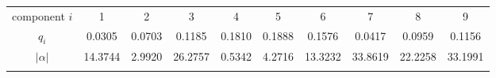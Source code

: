 %
%

\begin{table}
\footnotesize
\begin{center}
\begin{tabular}{|c|c|c|c|c|c|c|c|c|c|c|} \hline
\multicolumn{2}{|c|}{component $i$} & 1 & 2 & 3 & 4 & 5 & 6 & 7 & 8 & 9 \\
\multicolumn{2}{|c|}{$q_i$} & 0.0305 & 0.0703 & 0.1185 & 0.1810 & 0.1888 & 0.1576 & 0.0417 & 0.0959 & 0.1156 \\
\multicolumn{2}{|c|}{$|\alpha|$} & 14.3744 & 2.9920 & 26.2757 & 0.5342 &
4.2716 & 13.3232 & 33.8619 & 22.2258 & 33.1991 \\ \hline 
\multicolumn{11}{c}{} \\ \hline


\end{tabular}
\end{center}
\end{table}
